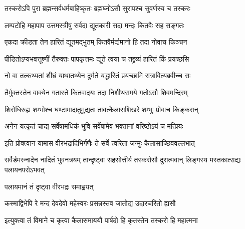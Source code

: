 
\vakta{}
\shrota{}
\tags{}

\storymeta





\twolineshloka
{तस्करोऽपि पुरा ब्रह्मन्सर्वधर्मबाहिष्कृतः}
{ब्रह्मघ्नोऽसौ सुरापश्च सुवर्णस्य च तस्करः}%

\twolineshloka
{लम्पटोहि महापाप उत्तमस्त्रीषु सर्वदा}
{द्यूतकारी सदा मन्दः कितवैः सह सङ्गतः}%

\twolineshloka
{एकदा क्रीडता तेन हारितं द्यूतमद्भुतम्}
{कितवैर्मर्द्यमानो हि तदा नोवाच किञ्चन}%

\twolineshloka
{पीडितोऽप्यभवत्तूष्णीं तैरुक्तः पापकृत्तमः}
{द्यूते त्वया च तद्द्रव्यं हारितं किं प्रयच्छसि}%

\twolineshloka
{नो वा तत्कथ्यतां शीघ्रं याथातथ्येन दुर्मते}
{यद्धारितं प्रयच्छामि रात्रावित्यब्रवीच्च सः}%

\twolineshloka
{तैर्मुक्तस्तेन वाक्येन गतास्ते कितवादयः}
{तदा निशीथसमये गतोऽसौ शिवमन्दिरम्}%

\twolineshloka
{शिरोधिरुह्य शम्भोश्च घण्टामादातुमुद्यतः}
{तावत्कैलासशिखरे शम्भुः प्रोवाच किङ्करान्}%

\twolineshloka
{अनेन यत्कृतं चाद्य सर्वेषामधिकं भुवि}
{सर्वेषामेव भक्तानां वरिष्ठोऽयं च मत्प्रियः}%

\twolineshloka
{इति प्रोक्त्वान यामास वीरभद्रादिभिर्गणैः}
{ते सर्वे त्वरिता जग्मुः कैलासाच्छिववल्लभात्}%

\threelineshloka
{सर्वैर्डमरुनादेन नादितं भुवनत्रयम्}
{तान्दृष्ट्वा सहसोत्तीर्य तस्करोसौ दुरात्मवान्}
{लिङ्गस्य मस्तकात्सद्यः पलायनपरोऽभवत्}%

\onelineshloka
{पलायमानं तं दृष्ट्वा वीरभद्रः समाह्वयत्}%

\twolineshloka
{कस्माद्विभेपि रे मन्द देवदेवो महेस्वरः}
{प्रसन्नस्तव जातोद्य उदारचरितो ह्यसौ}%

\twolineshloka
{इत्युक्त्वा तं विमाने च कृत्वा कैलासमाययौ}
{पार्षदो हि कृतस्तेन तस्करो हि महात्मना}%


